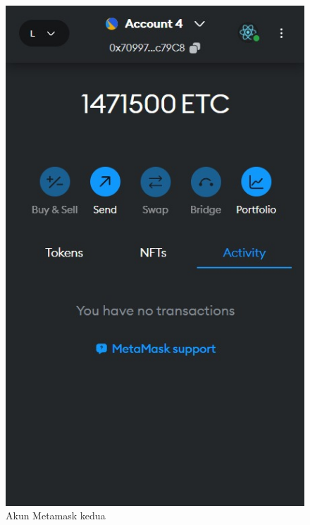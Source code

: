 \begin{itemize}
      \begin{figure} [H] \centering
        \includegraphics[scale=0.47]{gambar/metamask_akun_2.jpeg}
        \caption{Akun Metamask kedua}
        \label{fig:akun2}
        \end{figure}


\end{itemize}

